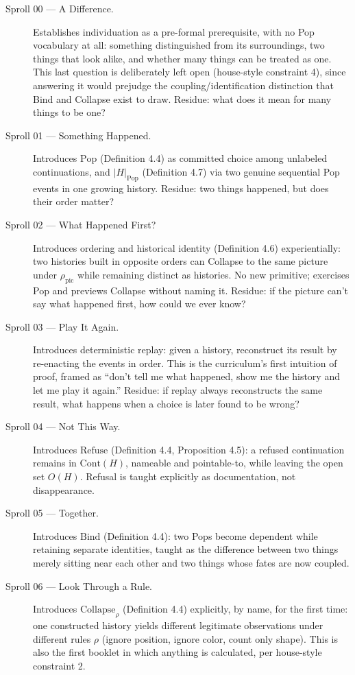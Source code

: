 \documentclass[11pt,twoside]{book}
\begin{document}
\begin{description}
\item[Sproll 00 --- A Difference.] Establishes individuation as a pre-formal prerequisite, with no Pop vocabulary at all: something distinguished from its surroundings, two things that look alike, and whether many things can be treated as one. This last question is deliberately left open (house-style constraint 4), since answering it would prejudge the coupling/identification distinction that Bind and Collapse exist to draw. Residue: what does it mean for many things to be one?
\item[Sproll 01 --- Something Happened.] Introduces $\mathrm{Pop}$ (Definition 4.4) as committed choice among unlabeled continuations, and $|H|_{\mathrm{Pop}}$ (Definition 4.7) via two genuine sequential Pop events in one growing history. Residue: two things happened, but does their order matter?
\item[Sproll 02 --- What Happened First?] Introduces ordering and historical identity (Definition 4.6) experientially: two histories built in opposite orders can Collapse to the same picture under $\rho_{\mathrm{pic}}$ while remaining distinct as histories. No new primitive; exercises Pop and previews Collapse without naming it. Residue: if the picture can't say what happened first, how could we ever know?
\item[Sproll 03 --- Play It Again.] Introduces deterministic replay: given a history, reconstruct its result by re-enacting the events in order. This is the curriculum's first intuition of proof, framed as ``don't tell me what happened, show me the history and let me play it again.'' Residue: if replay always reconstructs the same result, what happens when a choice is later found to be wrong?
\item[Sproll 04 --- Not This Way.] Introduces $\mathrm{Refuse}$ (Definition 4.4, Proposition 4.5): a refused continuation remains in $\mathrm{Cont}(H)$, nameable and pointable-to, while leaving the open set $O(H)$. Refusal is taught explicitly as documentation, not disappearance.
\item[Sproll 05 --- Together.] Introduces $\mathrm{Bind}$ (Definition 4.4): two Pops become dependent while retaining separate identities, taught as the difference between two things merely sitting near each other and two things whose fates are now coupled.
\item[Sproll 06 --- Look Through a Rule.] Introduces $\mathrm{Collapse}_\rho$ (Definition 4.4) explicitly, by name, for the first time: one constructed history yields different legitimate observations under different rules $\rho$ (ignore position, ignore color, count only shape). This is also the first booklet in which anything is calculated, per house-style constraint 2.

\end{description}
\end{document}
